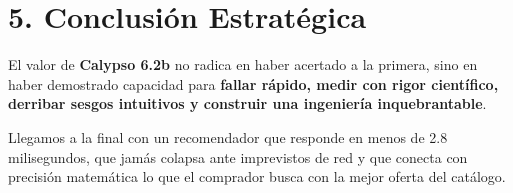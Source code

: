 \documentclass[11pt,a4paper]{article}
\begin{document}
\section{5. Conclusión Estratégica}

El valor de \textbf{Calypso 6.2b} no radica en haber acertado a la primera, sino en haber demostrado capacidad para \textbf{fallar rápido, medir con rigor científico, derribar sesgos intuitivos y construir una ingeniería inquebrantable}. 

Llegamos a la final con un recomendador que responde en menos de 2.8 milisegundos, que jamás colapsa ante imprevistos de red y que conecta con precisión matemática lo que el comprador busca con la mejor oferta del catálogo.
\end{document}
